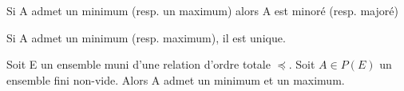 \documentclass[a4paper, 12pt]{article}
\begin{document}
\begin{remark}
    Si A admet un minimum (resp. un maximum) alors A est minoré (resp. majoré)
\end{remark}

\begin{remark}
    Si A admet un minimum (resp. maximum), il est unique.
\end{remark}

\begin{proposition}
    Soit E un ensemble muni d'une relation d'ordre totale $\preccurlyeq$.
    Soit $A \in P(E)$ un ensemble fini non-vide. Alors A admet un minimum et un maximum.
\end{proposition}
\end{document}
